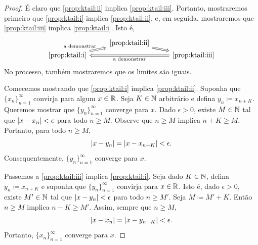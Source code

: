 \begin{proof}
É claro que
\ref{prop:ktail:ii} implica \ref{prop:ktail:iii}.
Portanto, mostraremos primeiro que
\ref{prop:ktail:i}
implica
\ref{prop:ktail:ii},
e, em seguida, mostraremos que
\ref{prop:ktail:iii}
implica
\ref{prop:ktail:i}. Isto é,
\begin{equation*}
\begin{tikzcd}[row sep=0pt]
& \text{\ref{prop:ktail:ii}} \ar[dr, Rightarrow] & \\
\text{\ref{prop:ktail:i}} \ar[ur, Rightarrow, "\text{a demonstrar}"] & &
\text{\ref{prop:ktail:iii}} \ar[ll, Rightarrow, "\text{a demonstrar}"]
\end{tikzcd}
\end{equation*}
No processo, também mostraremos que os limites são iguais.

Comecemos mostrando que \ref{prop:ktail:i} implica \ref{prop:ktail:ii}.
Suponha que $\{x_n \}_{n=1}^\infty$ convirja para algum $x \in {\mathbb{R}}$.
Seja $K \in {\mathbb{N}}$ arbitrário e defina $y_n \coloneqq x_{n+K}$. Queremos
mostrar que $\{ y_n \}_{n=1}^\infty$ converge para $x$.
Dado $\epsilon > 0$, existe $M \in {\mathbb{N}}$ tal que
$\lvert {x-x_n} \rvert < \epsilon$ para todo $n \geq M$.
Observe que $n \geq M$ implica $n+K \geq M$. Portanto, para todo
$n \geq M$,
\begin{equation*}
\lvert {x-y_n} \rvert = \lvert {x-x_{n+K}} \rvert < \epsilon .
\end{equation*}
Consequentemente, $\{ y_n \}_{n=1}^\infty$ converge para $x$.

Passemos a \ref{prop:ktail:iii} implica \ref{prop:ktail:i}.
Seja dado $K \in {\mathbb{N}}$, defina $y_n \coloneqq x_{n+K}$ e suponha que
$\{ y_n \}_{n=1}^\infty$ convirja para $x \in {\mathbb{R}}$.
Isto é, dado $\epsilon > 0$, existe $M' \in {\mathbb{N}}$ tal que
$\lvert {x-y_n} \rvert < \epsilon$ para todo $n \geq M'$.
Seja $M \coloneqq M'+K$. Então $n \geq M$ implica $n-K \geq M'$.
Assim, sempre que $n \geq M$,
\begin{equation*}
\lvert {x-x_n} \rvert = \lvert {x-y_{n-K}} \rvert < \epsilon.
\end{equation*}
Portanto, $\{ x_n \}_{n=1}^\infty$ converge para $x$.
\end{proof}

